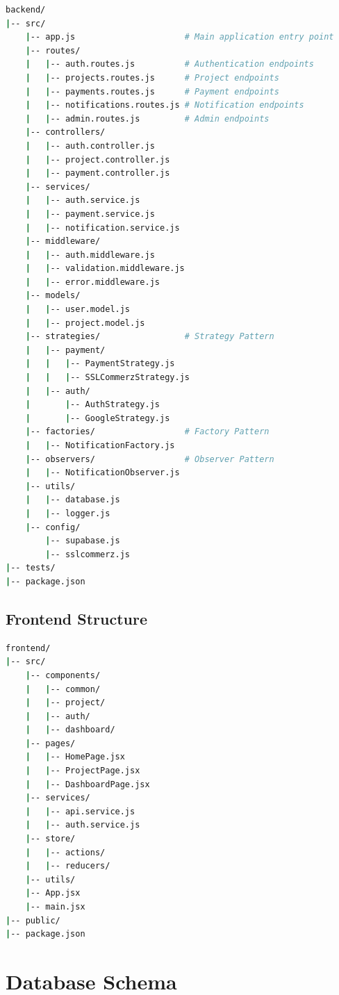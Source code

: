 \documentclass[a4paper,12pt]{report}
\begin{document}
\begin{lstlisting}[language=bash, caption=Backend File Structure]
backend/
|-- src/
    |-- app.js                      # Main application entry point
    |-- routes/
    |   |-- auth.routes.js          # Authentication endpoints
    |   |-- projects.routes.js      # Project endpoints
    |   |-- payments.routes.js      # Payment endpoints
    |   |-- notifications.routes.js # Notification endpoints
    |   |-- admin.routes.js         # Admin endpoints
    |-- controllers/
    |   |-- auth.controller.js
    |   |-- project.controller.js
    |   |-- payment.controller.js
    |-- services/
    |   |-- auth.service.js
    |   |-- payment.service.js
    |   |-- notification.service.js
    |-- middleware/
    |   |-- auth.middleware.js
    |   |-- validation.middleware.js
    |   |-- error.middleware.js
    |-- models/
    |   |-- user.model.js
    |   |-- project.model.js
    |-- strategies/                 # Strategy Pattern
    |   |-- payment/
    |   |   |-- PaymentStrategy.js
    |   |   |-- SSLCommerzStrategy.js
    |   |-- auth/
    |       |-- AuthStrategy.js
    |       |-- GoogleStrategy.js
    |-- factories/                  # Factory Pattern
    |   |-- NotificationFactory.js
    |-- observers/                  # Observer Pattern
    |   |-- NotificationObserver.js
    |-- utils/
    |   |-- database.js
    |   |-- logger.js
    |-- config/
        |-- supabase.js
        |-- sslcommerz.js
|-- tests/
|-- package.json
\end{lstlisting}

\subsection{Frontend Structure}

\begin{lstlisting}[language=bash, caption=Frontend File Structure]
frontend/
|-- src/
    |-- components/
    |   |-- common/
    |   |-- project/
    |   |-- auth/
    |   |-- dashboard/
    |-- pages/
    |   |-- HomePage.jsx
    |   |-- ProjectPage.jsx
    |   |-- DashboardPage.jsx
    |-- services/
    |   |-- api.service.js
    |   |-- auth.service.js
    |-- store/
    |   |-- actions/
    |   |-- reducers/
    |-- utils/
    |-- App.jsx
    |-- main.jsx
|-- public/
|-- package.json
\end{lstlisting}

\section{Database Schema}
\end{document}
